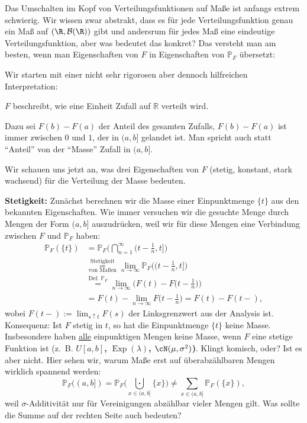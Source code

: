 \marginpar{\textcolor{red}{Vorlesung 7}}

Das Umschalten im Kopf von Verteilungsfunktionen auf Ma\ss e ist anfangs extrem schwierig. Wir wissen zwar abstrakt, dass es f\"ur jede Verteilungsfunktion genau ein Ma\ss{} auf $(\R, \mathcal B(\R))$ gibt und andersrum f\"ur jedes Ma\ss{} eine eindeutige Verteilungsfunktion, aber was bedeutet das konkret? Das versteht man am besten, wenn man Eigenschaften von $F$ in Eigenschaften von $\mathbb P_F$ \"ubersetzt:

\begin{disc}
Wir starten mit einer nicht sehr rigorosen aber dennoch hilfreichen Interpretation:
\begin{center} \glqq$F$ beschreibt, wie eine Einheit Zufall auf $\mathbb{R}$ verteilt wird.\grqq \end{center}
Dazu sei $F(b) - F(a)$  der Anteil des gesamten Zufalls, $F(b)-F(a)$ ist immer zwischen $0$ und $1$, der in $(a,b]$ gelandet ist. Man spricht auch statt \enquote{Anteil} von der \enquote{Masse} Zufall in $(a,b]$.\smallskip

Wir schauen uns jetzt an, was drei Eigenschaften von $F$ (stetig, konstant, stark wachsend) f\"ur die Verteilung der Masse bedeuten.\smallskip

\textbf{Stetigkeit:} Zun\"achst berechnen wir die Masse einer Einpunktmenge $\{t\}$ aus den bekannten Eigenschaften. Wie immer versuchen wir die gesuchte Menge durch Mengen der Form $(a,b]$ auszudr\"ucken, weil wir f\"ur diese Mengen eine Verbindung zwischen $F$ und $\mathbb P_F$ haben:
	 \begin{align*}
			\mathbb{P}_F(\{ t \}) &= 
			\mathbb{P}_F \Big(\bigcap\limits_{n = 1}^{\infty} (t - \frac{1}{n}, t] \Big) \\
			&\overset{\text{Stetigkeit}}{\underset{\text{von Maßen}}{=}} \lim\limits_{n \to \infty} \mathbb{P}_F\Big(\Big(t - \frac{1}{n}, t\Big]\Big) \\
			&\overset{\text{Def. }\mathbb P_F}{=} \lim\limits_{n \to \infty} \Big(F(t) - F\Big(t - \frac{1}{n}\Big)\Big)\\
			&= F(t) - \lim\limits_{n \to \infty} F\Big(t - \frac{1}{n}\Big) = F(t) - F(t-),
		\end{align*}
		wobei $F(t-):=\lim_{s\uparrow t} F(s)$ der Linksgrenzwert aus der Analysis ist. Konsequenz: Ist $F$ stetig in $t$, so hat die Einpunktmenge $\{t\}$ keine Masse. Insbesondere haben \underline{alle} einpunktigen Mengen keine Masse, wenn $F$ eine stetige Funktion ist (\mbox{z. B.} \textbf{$U[a,b]$, $\operatorname{Exp}(\lambda)$, $\cN(\mu, \sigma^2)$)}. Klingt komisch, oder? Ist es aber nicht. Hier sehen wir, warum Ma\ss e erst auf \"uberabz\"ahlbaren Mengen wirklich spannend werden: \[ \mathbb{P}_F((a,b]) = \mathbb{P}_F \Big( \bigcupdot\limits_{x \in (a,b]} \{x\} \Big) \neq \sum\limits_{x \in (a,b]} \mathbb{P}_F(\{x\}),\] weil $\sigma$-Additivität nur f\"ur Vereinigungen abz\"ahlbar vieler Mengen gilt. Was sollte die Summe auf der rechten Seite auch bedeuten?\smallskip
		

\end{disc}
